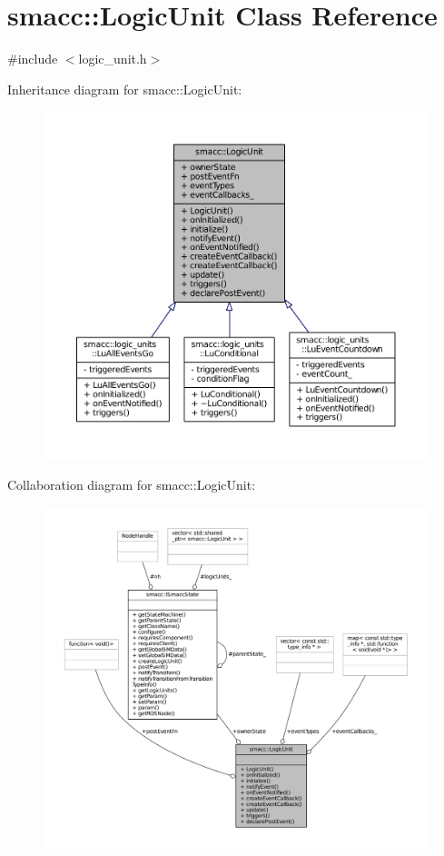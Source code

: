 \hypertarget{classsmacc_1_1LogicUnit}{}\section{smacc\+:\+:Logic\+Unit Class Reference}
\label{classsmacc_1_1LogicUnit}


{\ttfamily \#include $<$logic\+\_\+unit.\+h$>$}



Inheritance diagram for smacc\+:\+:Logic\+Unit\+:
\nopagebreak
\begin{figure}[H]
\begin{center}
\leavevmode
\includegraphics[width=350pt]{classsmacc_1_1LogicUnit__inherit__graph}
\end{center}
\end{figure}


Collaboration diagram for smacc\+:\+:Logic\+Unit\+:
\nopagebreak
\begin{figure}[H]
\begin{center}
\leavevmode
\includegraphics[width=350pt]{classsmacc_1_1LogicUnit__coll__graph}
\end{center}
\end{figure}
